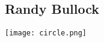 \documentclass[class=article,crop=false]{standalone}
\begin{document}
\subsection*{Randy Bullock}
\begin{center}
    \texttt{[image: circle.png]}
\end{center}
\end{document}
